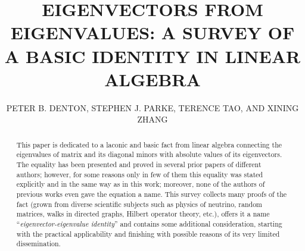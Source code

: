 \documentclass[12pt]{article}
\title{EIGENVECTORS FROM EIGENVALUES: A SURVEY OF A BASIC IDENTITY IN LINEAR ALGEBRA}
\author{PETER B. DENTON, STEPHEN J. PARKE, TERENCE TAO, AND XINING ZHANG}
\date{}
\begin{document}
\maketitle\thispagestyle{empty}
\begin{abstract}
This paper is dedicated to a laconic and basic fact from linear algebra connecting the eigenvalues of matrix and its diagonal minors with absolute values of its eigenvectors. The equality has been presented and proved in several prior papers of different authors; however, for some reasons only in few of them this equality was stated explicitly and in the same way as in this work; moreover, none of the authors of previous works even gave the equation a name. This survey collects many proofs of the fact (grown from diverse scientific subjects such as physics of neutrino, random matrices, walks in directed graphs, Hilbert operator theory, etc.), offers it a name ``\textit{eigenvector-eigenvalue identity}'' and contains some additional consideration, starting with the practical applicability and finishing with possible reasons of its very limited dissemination.
\end{abstract}
\end{document}
